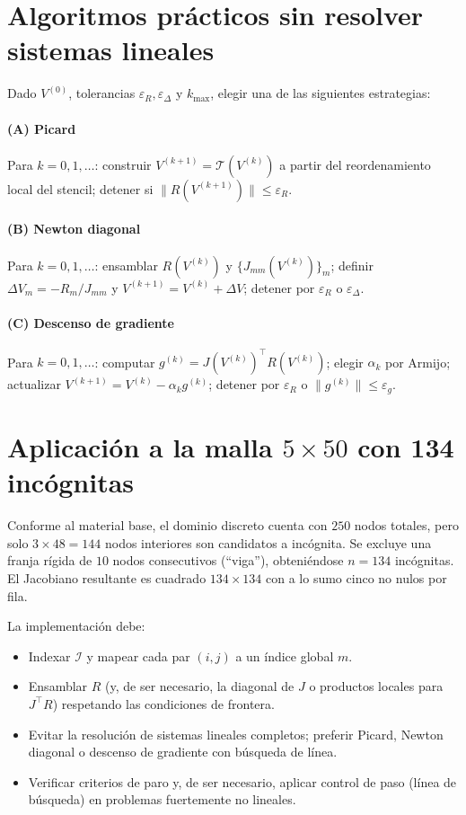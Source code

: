 \documentclass[12pt,letterpaper]{article}
\theoremstyle{definition}
\theoremstyle{remark}
\newcommand{\norm}[1]{\lVert #1\rVert}
\begin{document}
\section{Algoritmos prácticos sin resolver sistemas lineales}
\noindent Dado $V^{(0)}$, tolerancias $\varepsilon_R,\varepsilon_\Delta$ y $k_{\max}$, elegir una de las siguientes estrategias:

\paragraph{(A) Picard} Para $k=0,1,\dots$: construir $V^{(k+1)}=\mathcal{T}(V^{(k)})$ a partir del reordenamiento local del stencil; detener si $\norm{R(V^{(k+1)})}\le\varepsilon_R$.

\paragraph{(B) Newton diagonal} Para $k=0,1,\dots$: ensamblar $R(V^{(k)})$ y $\{J_{mm}(V^{(k)})\}_{m}$; definir $\Delta V_m=-R_m/J_{mm}$ y $V^{(k+1)}=V^{(k)}+\Delta V$; detener por $\varepsilon_R$ o $\varepsilon_\Delta$.

\paragraph{(C) Descenso de gradiente} Para $k=0,1,\dots$: computar $g^{(k)}=J(V^{(k)})^\top R(V^{(k)})$; elegir $\alpha_k$ por Armijo; actualizar $V^{(k+1)}=V^{(k)}-\alpha_k g^{(k)}$; detener por $\varepsilon_R$ o $\norm{g^{(k)}}\le\varepsilon_g$.

\section{Aplicación a la malla $5\times50$ con 134 incógnitas}
Conforme al material base, el dominio discreto cuenta con $250$ nodos totales, pero solo $3\times 48=144$ nodos interiores son candidatos a incógnita. Se excluye una franja rígida de $10$ nodos consecutivos (``viga''), obteniéndose $n=134$ incógnitas. El Jacobiano resultante es cuadrado $134\times134$ con a lo sumo cinco no nulos por fila.

La implementación debe:
\begin{itemize}
  \item Indexar $\mathcal{I}$ y mapear cada par $(i,j)$ a un índice global $m$.
  \item Ensamblar $R$ (y, de ser necesario, la diagonal de $J$ o productos locales para $J^\top R$) respetando las condiciones de frontera.
  \item Evitar la resolución de sistemas lineales completos; preferir Picard, Newton diagonal o descenso de gradiente con búsqueda de línea.
  \item Verificar criterios de paro y, de ser necesario, aplicar control de paso (línea de búsqueda) en problemas fuertemente no lineales.
\end{itemize}
\end{document}
